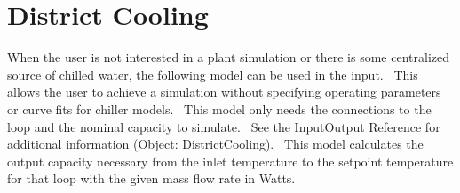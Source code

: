 \section{District Cooling }\label{district-cooling}

When the user is not interested in a plant simulation or there is some centralized source of chilled water, the following model can be used in the input.~ This allows the user to achieve a simulation without specifying operating parameters or curve fits for chiller models.~ This model only needs the connections to the loop and the nominal capacity to simulate.~ See the InputOutput Reference for additional information (Object: DistrictCooling).~ This model calculates the output capacity necessary from the inlet temperature to the setpoint temperature for that loop with the given mass flow rate in Watts.
